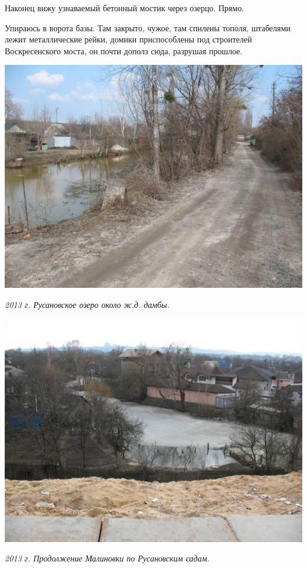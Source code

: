 Наконец вижу узнаваемый бетонный мостик через озерцо. Прямо. 

Упираюсь в ворота базы. Там закрыто, чужое, там спилены тополя, штабелями лежит металлические рейки, домики приспособлены под строителей Воскресенского моста, он почти дополз сюда, разрушая прошлое.

\newpage

\begin{center}
\includegraphics[width=0.98\linewidth]{chast-gorodki/radujnoe/s_IMG_2489.JPG}

\textit{2013 г. Русановское озеро около ж.д. дамбы.}
\end{center}

\begin{center}
\includegraphics[width=0.98\linewidth]{chast-gorodki/radujnoe/s_IMG_2490.JPG}

\textit{2013 г. Продолжение Малиновки по Русановским садам.}
\end{center}

